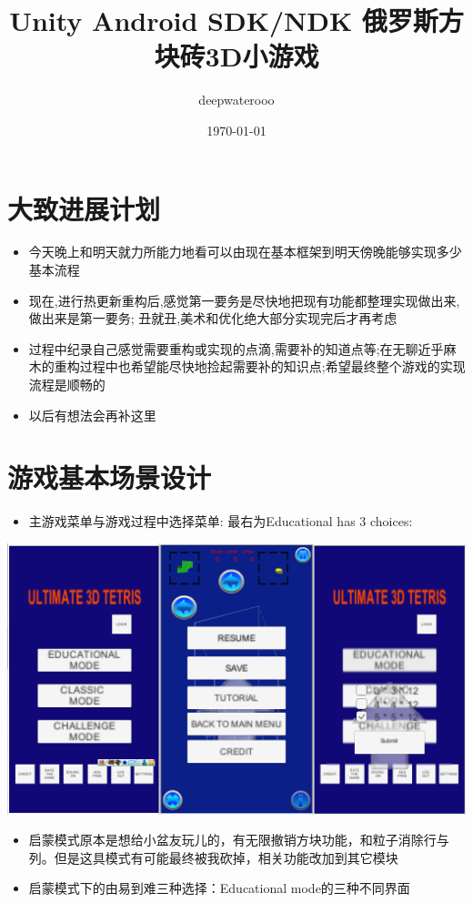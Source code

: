 \documentclass[9pt, b5paper]{article}
\author{deepwaterooo}
\date{\today}
\title{Unity Android SDK/NDK 俄罗斯方块砖3D小游戏}
\begin{document}
\maketitle
\tableofcontents


\section{大致进展计划}
\label{sec-1}
\begin{itemize}
\item 今天晚上和明天就力所能力地看可以由现在基本框架到明天傍晚能够实现多少基本流程
\item 现在,进行热更新重构后,感觉第一要务是尽快地把现有功能都整理实现做出来,做出来是第一要务; 丑就丑,美术和优化绝大部分实现完后才再考虑
\item 过程中纪录自己感觉需要重构或实现的点滴,需要补的知道点等;在无聊近乎麻木的重构过程中也希望能尽快地捡起需要补的知识点;希望最终整个游戏的实现流程是顺畅的
\item 以后有想法会再补这里
\end{itemize}
\section{游戏基本场景设计}
\label{sec-2}
\begin{itemize}
\item 主游戏菜单与游戏过程中选择菜单: 最右为Educational has 3 choices:
\end{itemize}

\includegraphics[width=.9\linewidth]{./pic/readme_20221007_192732.png}
\begin{itemize}
\item 启蒙模式原本是想给小盆友玩儿的，有无限撤销方块功能，和粒子消除行与列。但是这具模式有可能最终被我砍掉，相关功能改加到其它模块　
\item 启蒙模式下的由易到难三种选择：Educational mode的三种不同界面
\end{itemize}
\end{document}
